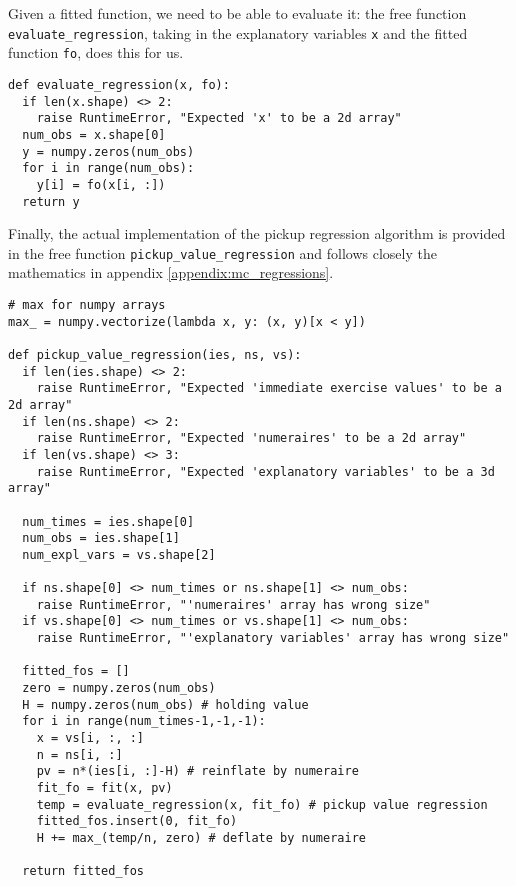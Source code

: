 Given a fitted function, we need to be able to
evaluate it: the free function \verb|evaluate_regression|, taking in
the explanatory variables \verb|x| and the fitted function \verb|fo|,
does this for us.
\begin{verbatim}
def evaluate_regression(x, fo):
  if len(x.shape) <> 2:
    raise RuntimeError, "Expected 'x' to be a 2d array"
  num_obs = x.shape[0]
  y = numpy.zeros(num_obs)
  for i in range(num_obs):
    y[i] = fo(x[i, :])
  return y
\end{verbatim}
Finally, the actual implementation of the pickup
regression algorithm is provided in the free function
\verb|pickup_value_regression| and follows closely the mathematics in
appendix \ref{appendix:mc_regressions}.
\begin{verbatim}
# max for numpy arrays
max_ = numpy.vectorize(lambda x, y: (x, y)[x < y])

def pickup_value_regression(ies, ns, vs):
  if len(ies.shape) <> 2:
    raise RuntimeError, "Expected 'immediate exercise values' to be a 2d array"
  if len(ns.shape) <> 2:
    raise RuntimeError, "Expected 'numeraires' to be a 2d array"
  if len(vs.shape) <> 3:
    raise RuntimeError, "Expected 'explanatory variables' to be a 3d array"

  num_times = ies.shape[0]
  num_obs = ies.shape[1]
  num_expl_vars = vs.shape[2]

  if ns.shape[0] <> num_times or ns.shape[1] <> num_obs:
    raise RuntimeError, "'numeraires' array has wrong size"
  if vs.shape[0] <> num_times or vs.shape[1] <> num_obs:
    raise RuntimeError, "'explanatory variables' array has wrong size"

  fitted_fos = []
  zero = numpy.zeros(num_obs)
  H = numpy.zeros(num_obs) # holding value
  for i in range(num_times-1,-1,-1):
    x = vs[i, :, :]
    n = ns[i, :]
    pv = n*(ies[i, :]-H) # reinflate by numeraire
    fit_fo = fit(x, pv)
    temp = evaluate_regression(x, fit_fo) # pickup value regression
    fitted_fos.insert(0, fit_fo)
    H += max_(temp/n, zero) # deflate by numeraire

  return fitted_fos
\end{verbatim}


